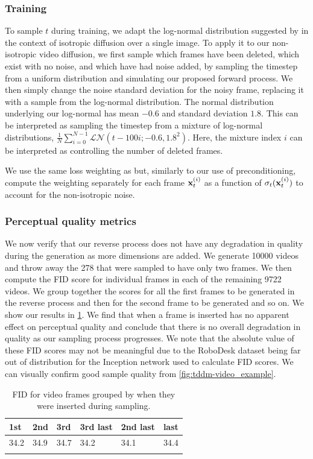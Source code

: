 \subsubsection{Training}
To sample $t$ during training, we adapt the log-normal distribution suggested by \citet{karras2022elucidating} in the context of isotropic diffusion over a single image. To apply it to our non-isotropic video diffusion, we first sample which frames have been deleted, which exist with no noise, and which have had noise added, by sampling the timestep from a uniform distribution and simulating our proposed forward process. We then simply change the noise standard deviation for the noisy frame, replacing it with a sample from the log-normal distribution. The normal distribution underlying our log-normal has mean $-0.6$ and standard deviation $1.8$. 
%
This can be interpreted as sampling the timestep from a mixture of log-normal distributions, $\frac{1}{N}\sum_{i=0}^{N-1} \mathcal{LN}(t-100i; -0.6, 1.8^2)$. Here, the mixture index $i$ can be interpreted as controlling the number of deleted frames.

We use the same loss weighting as \citet{karras2022elucidating} but, similarly to our use of preconditioning, compute the weighting separately for each frame ${\mathbf{x}}_t^{(i)}$ as a function of $\sigma_t({\mathbf{x}}_t^{(i)})$ to account for the non-isotropic noise.

\subsubsection{Perceptual quality metrics}
We now verify that our reverse process does not have any degradation in quality during the generation as more dimensions are added. We generate 10000 videos and throw away the 278 that were sampled to have only two frames. We then compute the FID score for individual frames in each of the remaining 9722 videos. We group together the scores for all the first frames to be generated in the reverse process and then for the second frame to be generated and so on. We show our results in \cref{tab:fid-by-insertion-order}. We find that when a frame is inserted has no apparent effect on perceptual quality and conclude that there is no overall degradation in quality as our sampling process progresses. We note that the absolute value of these FID scores may not be meaningful due to the RoboDesk dataset being far out of distribution for the Inception network used to calculate FID scores. We can visually confirm good sample quality from \cref{fig:tddm-video_example}.
\begin{table}[h]
\centering
\caption{FID for video frames grouped by when they were inserted during sampling.}
\begin{tabular}{p{1.5cm}p{1.5cm}p{1.5cm}|p{1.5cm}p{1.5cm}p{1.5cm}}
\toprule
1st & 2nd & 3rd & 3rd last & 2nd last & last \\
\midrule
34.2 & 34.9 & 34.7 & 34.2 & 34.1 & 34.4 \\
\bottomrule
\label{tab:fid-by-insertion-order}
\end{tabular}
\end{table}